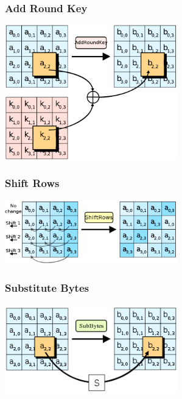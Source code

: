 \documentclass[handout]{beamer}
\begin{document}
\begin{frame}
	\frametitle{Add Round Key}
	\begin{center}
      		\includegraphics[width=75mm]{images/ark.png}
	\end{center}
\end{frame}

\begin{frame}
	\frametitle{Shift Rows}
	\begin{center}
      		\includegraphics[width=75mm]{images/shift.png}
	\end{center}
\end{frame}

\begin{frame}
	\frametitle{Substitute Bytes} %
	\begin{center}
      		\includegraphics[width=75mm]{images/sub.png}
	\end{center}
\end{frame}
\end{document}
